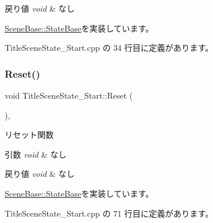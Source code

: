 \begin{DoxyRetVals}{戻り値}
{\em void} & なし \\
\hline
\end{DoxyRetVals}


\mbox{\hyperlink{class_scene_base_1_1_state_base_a33350231b039a2178c19beac0211c5b8}{Scene\+Base\+::\+State\+Base}}を実装しています。



 Title\+Scene\+State\+\_\+\+Start.\+cpp の 34 行目に定義があります。

\mbox{\label{class_title_scene_state___start_af4dfe902a4391ca8f0cff5d1aa9507f8}} 
\subsubsection{\texorpdfstring{Reset()}{Reset()}}
{\footnotesize\ttfamily void Title\+Scene\+State\+\_\+\+Start\+::\+Reset (\begin{DoxyParamCaption}{ }\end{DoxyParamCaption})\hspace{0.3cm}{\ttfamily [override]}, {\ttfamily [virtual]}}



リセット関数 


\begin{DoxyParams}{引数}
{\em void} & なし \\
\hline
\end{DoxyParams}

\begin{DoxyRetVals}{戻り値}
{\em void} & なし \\
\hline
\end{DoxyRetVals}


\mbox{\hyperlink{class_scene_base_1_1_state_base_a2e14a3afece0b1d8db9edcebf514a977}{Scene\+Base\+::\+State\+Base}}を実装しています。



 Title\+Scene\+State\+\_\+\+Start.\+cpp の 71 行目に定義があります。

\mbox{\label{class_title_scene_state___start_a5bcb4d7a9250ea1c0041c38616ffabfe}} 
